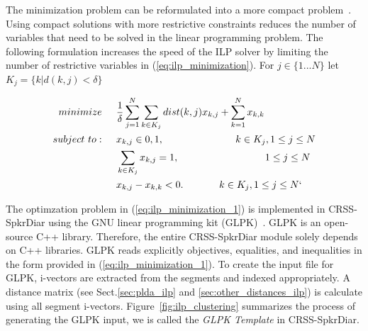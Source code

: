 The minimization problem can be reformulated into a more compact problem~\cite{dupuy2014ILPimprovement}. 
Using compact solutions with more restrictive constraints reduces the number of variables that need to be solved in the linear programming problem. 
The following formulation increases the speed of the ILP solver by limiting the number of restrictive variables in (\ref{eq:ilp_minimization}). For $j \in \{1 ... N\}$ let $K_j = \{k | d(k,j) < \delta\}$ 




\begin{equation}
\label{eq:ilp_minimization_1}
\begin{split}
minimize \hspace{0.2in}& \frac{1}{\delta}\sum\limits_{j=1}^{N}\sum\limits_{k\in K_j}dist(k,j)x_{k,j} + \sum\limits_{k=1}^{N}x_{k,k} \\
subject~to:  \hspace{0.2in}& x_{k,j} \in {0,1}, \hspace{1in} k \in K_j , 1 \leq j \leq N \\
 & \sum\limits_{k\in K_j}x_{k,j} = 1, \hspace{1.2in} 1 \leq j \leq N \\
 & x_{k,j} - x_{k,k} < 0. \hspace{0.5in} k \in K_j , 1 \leq j \leq N`
\end{split}
\end{equation}

The optimzation problem in (\ref{eq:ilp_minimization_1}) is implemented in CRSS-SpkrDiar using the GNU linear programming kit (GLPK)~\cite{makhorin2008glpk}. GLPK is an open-source C++ library. 
Therefore, the entire CRSS-SpkrDiar module solely depends on C++ libraries. 
GLPK reads explicitly objectives, equalities, and inequalities in the form provided in (\ref{eq:ilp_minimization_1}). 
To create the input file for GLPK, i-vectors are extracted from the segments and indexed appropriately. 
A distance matrix (see Sect.\ref{sec:plda_ilp} and \ref{sec:other_distances_ilp}) is calculate using all segment i-vectors. 
Figure~\ref{fig:ilp_clustering} summarizes the process of generating the GLPK input, we is called the {\it GLPK Template} in CRSS-SpkrDiar. 

